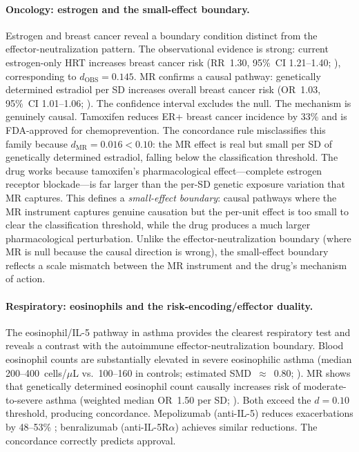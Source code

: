 \documentclass[11pt]{article}
\begin{document}
\paragraph{Oncology: estrogen and the small-effect boundary.}
Estrogen and breast cancer reveal a boundary condition distinct from the effector-neutralization pattern. The observational evidence is strong: current estrogen-only HRT increases breast cancer risk (RR~1.30, 95\%~CI 1.21--1.40; \cite{beral2003mws}), corresponding to $d_{\text{OBS}} = 0.145$. MR confirms a causal pathway: genetically determined estradiol per SD increases overall breast cancer risk (OR~1.03, 95\%~CI 1.01--1.06; \cite{shi2023estradiolBC}). The confidence interval excludes the null. The mechanism is genuinely causal. Tamoxifen reduces ER+ breast cancer incidence by 33\% \cite{cuzick2015tamoxifen} and is FDA-approved for chemoprevention. The concordance rule misclassifies this family because $d_{\text{MR}} = 0.016 < 0.10$: the MR effect is real but small per SD of genetically determined estradiol, falling below the classification threshold. The drug works because tamoxifen's pharmacological effect---complete estrogen receptor blockade---is far larger than the per-SD genetic exposure variation that MR captures. This defines a \emph{small-effect boundary}: causal pathways where the MR instrument captures genuine causation but the per-unit effect is too small to clear the classification threshold, while the drug produces a much larger pharmacological perturbation. Unlike the effector-neutralization boundary (where MR is null because the causal direction is wrong), the small-effect boundary reflects a scale mismatch between the MR instrument and the drug's mechanism of action.

\paragraph{Respiratory: eosinophils and the risk-encoding/effector duality.}
The eosinophil/IL-5 pathway in asthma provides the clearest respiratory test and reveals a contrast with the autoimmune effector-neutralization boundary. Blood eosinophil counts are substantially elevated in severe eosinophilic asthma (median 200--400~cells/$\mu$L vs.\ 100--160 in controls; estimated SMD~$\approx$~0.80; \cite{wagener2022eosinophils}). MR shows that genetically determined eosinophil count causally increases risk of moderate-to-severe asthma (weighted median OR~1.50 per SD; \cite{han2020eosinophilasthma}). Both exceed the $d = 0.10$ threshold, producing concordance. Mepolizumab (anti-IL-5) reduces exacerbations by 48--53\% \cite{pavord2012dream}; benralizumab (anti-IL-5R$\alpha$) achieves similar reductions. The concordance correctly predicts approval.
\end{document}
